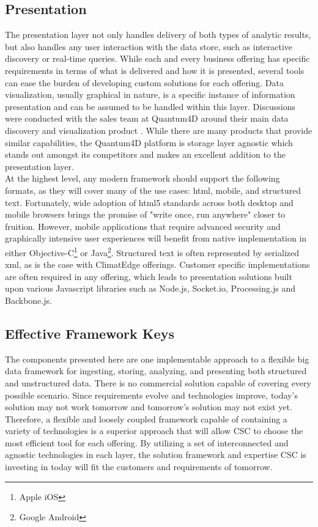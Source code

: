 \subsection{Presentation}
The presentation layer not only handles delivery of both types of analytic results, but also handles any user interaction with the data store, such as interactive discovery or real-time queries. While each and every business offering has specific requirements in terms of what is delivered and how it is presented, several tools can ease the burden of developing custom solutions for each offering. Data visualization, usually graphical in nature, is a specific instance of information presentation and can be assumed to be handled within this layer. Discussions were conducted with the sales team at Quantum4D around their main data discovery and visualization product \cite{quantum}. While there are many products that provide similar capabilities, the Quantum4D platform is storage layer agnostic which stands out amongst its competitors and makes an excellent addition to the presentation layer.\\

At the highest level, any modern framework should support the following formats, as they will cover many of the use cases: \gls{html}, mobile, and structured text. Fortunately, wide adoption of \gls{html}5 standards across both desktop and mobile browsers brings the promise of "write once, run anywhere" closer to fruition. However, mobile applications that require advanced security and graphically intensive user experiences will benefit from native implementation in either Objective-C\footnote{Apple iOS} or Java\footnote{Google Android}. Structured text is often represented by serialized \gls{xml}, as is the case with ClimatEdge offerings. Customer specific implementations are often required in any offering, which leads to presentation solutions built upon various Javascript libraries such as Node.js, Socket.io, Processing.js and Backbone.js.
\subsection{Effective Framework Keys}
The components presented here are one implementable approach to a flexible big data framework for ingesting, storing, analyzing, and presenting both structured and unstructured data. There is no commercial solution capable of covering every possible scenario. Since requirements evolve and technologies improve, today's solution may not work tomorrow and tomorrow's solution may not exist yet. Therefore, a flexible and loosely coupled framework capable of containing a variety of technologies is a superior approach that will allow \textsc{CSC} to choose the most efficient tool for each offering. By utilizing a set of interconnected and agnostic technologies in each layer, the solution framework and expertise \textsc{CSC} is investing in today will fit the customers and requirements of tomorrow.
